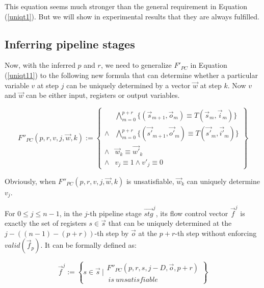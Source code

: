 \documentclass[runningheads,a4paper,orivec]{llncs}
\begin{document}
This equation seems much stronger than the general requirement in Equation (\ref{uniqt1}).
But we will show in experimental results that 
they are always fulfilled.



\subsection{Inferring pipeline stages}\label{subsec_inferstage}

Now,
with the inferred $p$ and $r$,
we need to generalize $F'_{PC}$ in Equation (\ref{uniqt11}) to the following new formula that
can determine whether a particular variable $v$ at step $j$
can be uniquely determined by a vector $\vec{w}$ at step $k$.
Now $v$ and $\vec{w}$ can be either input, registers or output variables.

\begin{equation}\label{uniqt2}
F''_{PC}(p,r,v,j,\vec{w},k):=
\left\{
\begin{array}{cc}
&\bigwedge_{m=0}^{p+r}
\{
(\vec{s}_{m+1},\vec{o}_m)\equiv T(\vec{s}_m,\vec{i}_m)
\}
\\
\wedge&\bigwedge_{m=0}^{p+r}
\{
(\vec{s'}_{m+1},\vec{o'}_m)\equiv T(\vec{s'}_m,\vec{i'}_m)
\}
\\
\wedge&\vec{w}_{k}\equiv \vec{w'}_{k} \\
\wedge& v_{j}\equiv 1 \wedge  v'_{j}\equiv 0 
\end{array}
\right\}
\end{equation}

Obviously,
when $F''_{PC}(p,r,v,j,\vec{w},k)$ is unsatisfiable,
$\vec{w}_k$ can uniquely determine $v_j$.

For $0\le j\le n-1$,
in the $j$-th pipeline stage $\vec{stg}^j$,
its flow control vector $\vec{f}^j$ is exactly the set of registers $s\in \vec{s}$ 
that can be uniquely determined at the $j-((n-1)-(p+r))$-th step by $\vec{o}$ 
at the $p+r$-th step without enforcing $valid(\vec{f}_p)$.
It can be formally defined as:

\begin{equation}\label{stgn_fj}
\vec{f}^{j} := 
 \left\{
 s\in \vec{s} ~| 
\begin{array}{cc}
 F''_{PC}(p,r,s,j-D,\vec{o},p+r)\\
 ~is~unsatisfiable
\end{array}
\right\}
\end{equation}
\end{document}
